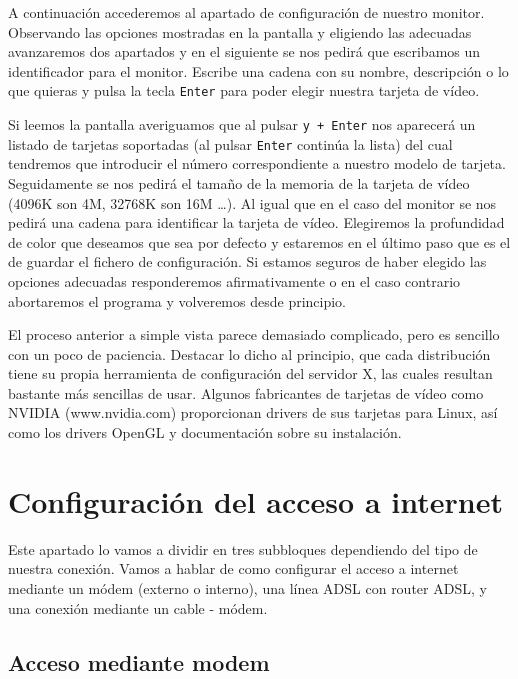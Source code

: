 A  continuación accederemos  al apartado  de configuración  de nuestro
monitor. Observando las opciones mostradas  en la pantalla y eligiendo
las  adecuadas avanzaremos  dos apartados  y  en el  siguiente se  nos
pedirá que  escribamos un identificador  para el monitor.  Escribe una
cadena con  su nombre, descripción o  lo que quieras y  pulsa la tecla
{\tt Enter} para poder elegir nuestra tarjeta de vídeo.

Si leemos  la pantalla averiguamos que  al pulsar {\tt y  + Enter} nos
aparecerá un  listado de  tarjetas soportadas  (al pulsar  {\tt Enter}
continúa  la  lista)  del  cual tendremos  que  introducir  el  número
correspondiente  a  nuestro modelo  de  tarjeta.  Seguidamente se  nos
pedirá el tamaño de  la memoria de la tarjeta de  vídeo (4096K son 4M,
32768K son  16M \ldots). Al  igual que en el  caso del monitor  se nos
pedirá una cadena para identificar  la tarjeta de vídeo. Elegiremos la
profundidad de color  que deseamos que sea por defecto  y estaremos en
el último  paso que es el  de guardar el fichero  de configuración. Si
estamos seguros de haber  elegido las opciones adecuadas responderemos
afirmativamente  o en  el  caso contrario  abortaremos  el programa  y
volveremos desde principio.

El proceso anterior  a simple vista parece  demasiado complicado, pero
es sencillo con un poco de  paciencia. Destacar lo dicho al principio,
que cada distribución tiene su propia herramienta de configuración del
servidor  X,  las cuales  resultan  bastante  más sencillas  de  usar.
Algunos fabricantes de tarjetas  de vídeo como NVIDIA (www.nvidia.com)
proporcionan drivers de sus tarjetas  para Linux, así como los drivers
OpenGL y documentación sobre su instalación.

\section{Configuración del acceso a internet}

Este apartado  lo vamos a  dividir en tres subbloques  dependiendo del
tipo de nuestra conexión. Vamos a  hablar de como configurar el acceso
a internet mediante  un módem (externo o interno), una  línea ADSL con
router ADSL, y una conexión mediante un cable - módem.

\subsection{Acceso mediante modem}

